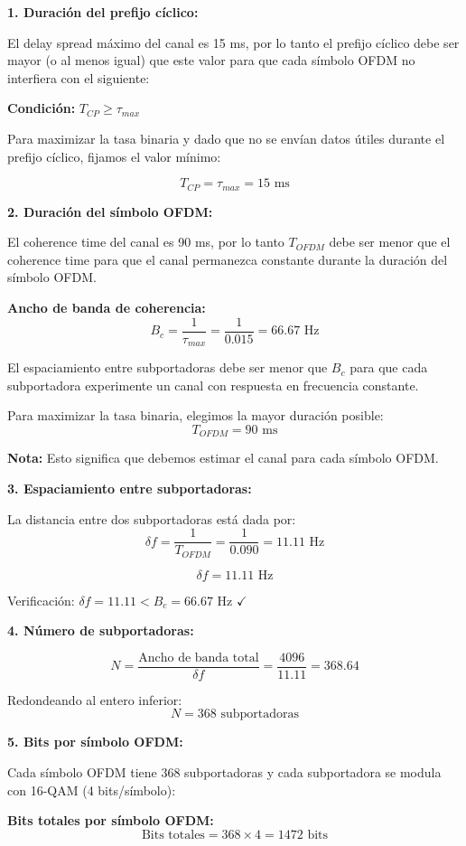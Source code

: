 \documentclass[10pt,a4paper]{article}
\begin{document}
\begin{solucion}
\textbf{1. Duración del prefijo cíclico:}

El delay spread máximo del canal es 15 ms, por lo tanto el prefijo cíclico debe ser mayor (o al menos igual) que este valor para que cada símbolo OFDM no interfiera con el siguiente:

\textbf{Condición:} $T_{CP} \geq \tau_{max}$

Para maximizar la tasa binaria y dado que no se envían datos útiles durante el prefijo cíclico, fijamos el valor mínimo:

\[
\boxed{T_{CP} = \tau_{max} = 15\text{ ms}}
\]

\textbf{2. Duración del símbolo OFDM:}

El coherence time del canal es 90 ms, por lo tanto $T_{OFDM}$ debe ser menor que el coherence time para que el canal permanezca constante durante la duración del símbolo OFDM.

\textbf{Ancho de banda de coherencia:}
\[
B_c = \frac{1}{\tau_{max}} = \frac{1}{0.015} = 66.67\text{ Hz}
\]

El espaciamiento entre subportadoras debe ser menor que $B_c$ para que cada subportadora experimente un canal con respuesta en frecuencia constante.

Para maximizar la tasa binaria, elegimos la mayor duración posible:
\[
\boxed{T_{OFDM} = 90\text{ ms}}
\]

\textbf{Nota:} Esto significa que debemos estimar el canal para cada símbolo OFDM.

\textbf{3. Espaciamiento entre subportadoras:}

La distancia entre dos subportadoras está dada por:
\[
\delta f = \frac{1}{T_{OFDM}} = \frac{1}{0.090} = 11.11\text{ Hz}
\]

\[
\boxed{\delta f = 11.11\text{ Hz}}
\]

Verificación: $\delta f = 11.11 < B_c = 66.67$ Hz $\checkmark$

\textbf{4. Número de subportadoras:}

\[
N = \frac{\text{Ancho de banda total}}{\delta f} = \frac{4096}{11.11} = 368.64
\]

Redondeando al entero inferior:
\[
\boxed{N = 368\text{ subportadoras}}
\]

\textbf{5. Bits por símbolo OFDM:}

Cada símbolo OFDM tiene 368 subportadoras y cada subportadora se modula con 16-QAM (4 bits/símbolo):

\textbf{Bits totales por símbolo OFDM:}
\[
\text{Bits totales} = 368 \times 4 = 1472\text{ bits}
\]


\end{solucion}
\end{document}
